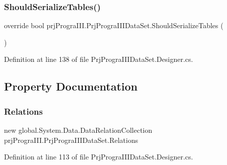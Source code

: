 \subsubsection{\texorpdfstring{Should\+Serialize\+Tables()}{ShouldSerializeTables()}}
{\footnotesize\ttfamily override bool prj\+Progra\+I\+I\+I.\+Prj\+Progra\+I\+I\+I\+Data\+Set.\+Should\+Serialize\+Tables (\begin{DoxyParamCaption}{ }\end{DoxyParamCaption})\hspace{0.3cm}{\ttfamily [protected]}}



Definition at line 138 of file Prj\+Progra\+I\+I\+I\+Data\+Set.\+Designer.\+cs.



\subsection{Property Documentation}
\hypertarget{classprj_progra_i_i_i_1_1_prj_progra_i_i_i_data_set_af33da0ed81cd58ea86643f3473273a0d}{}\label{classprj_progra_i_i_i_1_1_prj_progra_i_i_i_data_set_af33da0ed81cd58ea86643f3473273a0d} 
\subsubsection{\texorpdfstring{Relations}{Relations}}
{\footnotesize\ttfamily new global.\+System.\+Data.\+Data\+Relation\+Collection prj\+Progra\+I\+I\+I.\+Prj\+Progra\+I\+I\+I\+Data\+Set.\+Relations\hspace{0.3cm}{\ttfamily [get]}}



Definition at line 113 of file Prj\+Progra\+I\+I\+I\+Data\+Set.\+Designer.\+cs.

\hypertarget{classprj_progra_i_i_i_1_1_prj_progra_i_i_i_data_set_a1234c1cfa78b6c2add509b6aa81fc769}{}\label{classprj_progra_i_i_i_1_1_prj_progra_i_i_i_data_set_a1234c1cfa78b6c2add509b6aa81fc769} 
